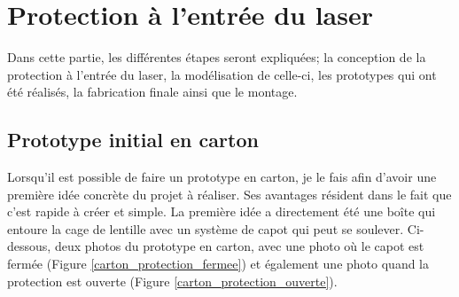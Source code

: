 
\begin{minipage}{\textwidth}
    \section{Protection à l'entrée du laser}
    Dans cette partie, les différentes étapes seront expliquées; la conception de la protection à l'entrée du laser, la modélisation de celle-ci, les prototypes qui ont été réalisés, la fabrication finale ainsi que le montage.

    \subsection{Prototype initial en carton}
    Lorsqu'il est possible de faire un prototype en carton, je le fais afin d'avoir une première idée concrète du projet à réaliser. Ses avantages résident dans le fait que c'est rapide à créer et simple. La première idée a directement été une boîte qui entoure la cage de lentille avec un système de capot qui peut se soulever. Ci-dessous, deux photos du prototype en carton, avec une photo où le capot est fermée (Figure \ref{carton_protection_fermee}) et également une photo quand la protection est ouverte (Figure \ref{carton_protection_ouverte}).


\end{minipage}
